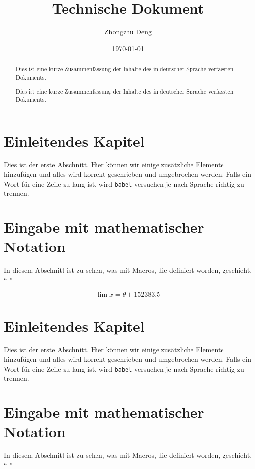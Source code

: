 \documentclass[10pt,twocolumn]{extarticle}
\title{Technische Dokument}
\author{Zhongzhu Deng}
\date{\today}
\begin{document}
\maketitle
\tableofcontents



\begin{abstract}
Dies ist eine kurze Zusammenfassung der Inhalte des in deutscher Sprache
verfassten Dokuments.
\end{abstract}

\section{Einleitendes Kapitel}
Dies ist der erste Abschnitt. Hier können wir einige zusätzliche Elemente
hinzufügen und alles wird korrekt geschrieben und umgebrochen werden. Falls ein
Wort für eine Zeile zu lang ist, wird \texttt{babel} versuchen je nach Sprache
richtig zu trennen.

\section{Eingabe mit mathematischer Notation}
In diesem Abschnitt ist zu sehen, was mit Macros, die definiert worden,
geschieht. "` "'

\[ \lim x =  \theta + 152383.5 \]

 
\begin{abstract}
Dies ist eine kurze Zusammenfassung der Inhalte des in deutscher Sprache
verfassten Dokuments.
\end{abstract}

\section{Einleitendes Kapitel}
Dies ist der erste Abschnitt. Hier können wir einige zusätzliche Elemente
hinzufügen und alles wird korrekt geschrieben und umgebrochen werden. Falls ein
Wort für eine Zeile zu lang ist, wird \texttt{babel} versuchen je nach Sprache
richtig zu trennen.

\section{Eingabe mit mathematischer Notation}
In diesem Abschnitt ist zu sehen, was mit Macros, die definiert worden,
geschieht. "` "'
\end{document}
